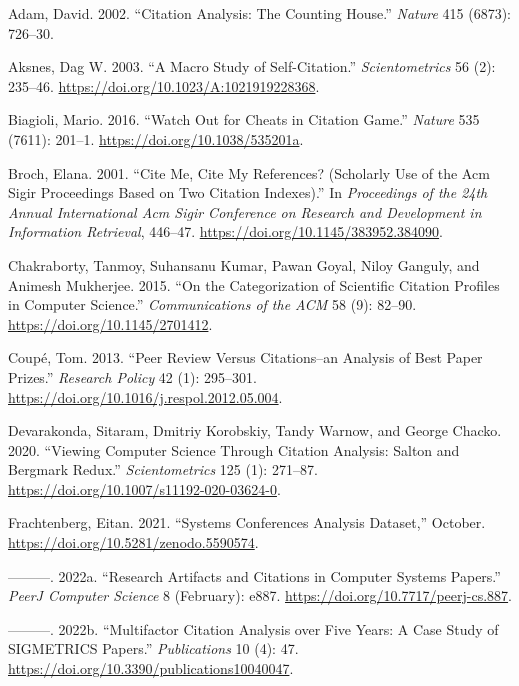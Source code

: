 \documentclass{article}
\begin{document}
\hypertarget{refs}{}
\leavevmode\hypertarget{ref-adam02:citation}{}%
Adam, David. 2002. ``Citation Analysis: The Counting House.'' \emph{Nature} 415 (6873): 726--30.

\leavevmode\hypertarget{ref-aksnes03:macro}{}%
Aksnes, Dag W. 2003. ``A Macro Study of Self-Citation.'' \emph{Scientometrics} 56 (2): 235--46. \url{https://doi.org/10.1023/A:1021919228368}.

\leavevmode\hypertarget{ref-biagioli16:watch}{}%
Biagioli, Mario. 2016. ``Watch Out for Cheats in Citation Game.'' \emph{Nature} 535 (7611): 201--1. \url{https://doi.org/10.1038/535201a}.

\leavevmode\hypertarget{ref-broch01:cite}{}%
Broch, Elana. 2001. ``Cite Me, Cite My References? (Scholarly Use of the Acm Sigir Proceedings Based on Two Citation Indexes).'' In \emph{Proceedings of the 24th Annual International Acm Sigir Conference on Research and Development in Information Retrieval}, 446--47. \url{https://doi.org/10.1145/383952.384090}.

\leavevmode\hypertarget{ref-chakraborty15:categorization}{}%
Chakraborty, Tanmoy, Suhansanu Kumar, Pawan Goyal, Niloy Ganguly, and Animesh Mukherjee. 2015. ``On the Categorization of Scientific Citation Profiles in Computer Science.'' \emph{Communications of the ACM} 58 (9): 82--90. \url{https://doi.org/10.1145/2701412}.

\leavevmode\hypertarget{ref-coupe13:peer}{}%
Coupé, Tom. 2013. ``Peer Review Versus Citations--an Analysis of Best Paper Prizes.'' \emph{Research Policy} 42 (1): 295--301. \url{https://doi.org/10.1016/j.respol.2012.05.004}.

\leavevmode\hypertarget{ref-devarakonda20:viewing}{}%
Devarakonda, Sitaram, Dmitriy Korobskiy, Tandy Warnow, and George Chacko. 2020. ``Viewing Computer Science Through Citation Analysis: Salton and Bergmark Redux.'' \emph{Scientometrics} 125 (1): 271--87. \url{https://doi.org/10.1007/s11192-020-03624-0}.

\leavevmode\hypertarget{ref-frachtenberg:github-repo}{}%
Frachtenberg, Eitan. 2021. ``Systems Conferences Analysis Dataset,'' October. \url{https://doi.org/10.5281/zenodo.5590574}.

\leavevmode\hypertarget{ref-frachtenberg22:artifact}{}%
---------. 2022a. ``Research Artifacts and Citations in Computer Systems Papers.'' \emph{PeerJ Computer Science} 8 (February): e887. \url{https://doi.org/10.7717/peerj-cs.887}.

\leavevmode\hypertarget{ref-frachtenberg22:sigmetrics}{}%
---------. 2022b. ``Multifactor Citation Analysis over Five Years: A Case Study of SIGMETRICS Papers.'' \emph{Publications} 10 (4): 47. \url{https://doi.org/10.3390/publications10040047}.
\end{document}
